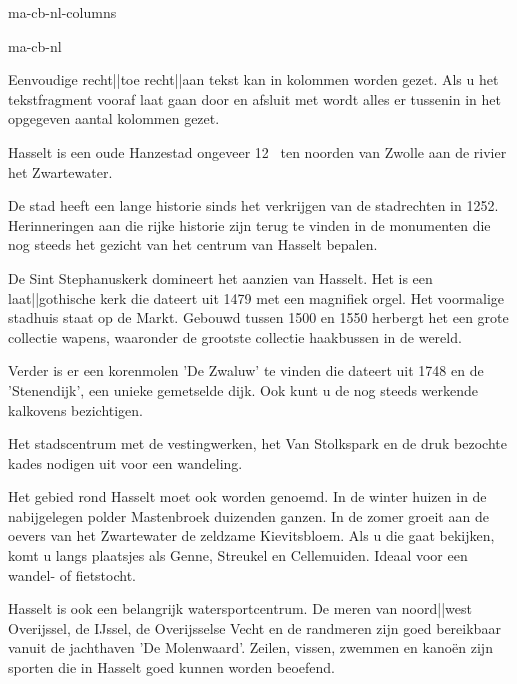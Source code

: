 \startonderdeel ma-cb-nl-columns

\produkt ma-cb-nl




Eenvoudige recht||toe recht||aan tekst kan in kolommen worden
gezet. Als u het tekstfragment vooraf laat gaan door
\type{\startkolommen} en afsluit met \type{\stopkolommen}
wordt alles er tussenin in het opgegeven aantal kolommen
gezet.


\startbuffer
\startkolommen[n=3,tolerantie=zeersoepel]
Hasselt is een oude Hanzestad ongeveer 12 \Kilo \Meter\ ten
noorden van Zwolle aan de rivier het Zwartewater.

De stad heeft een lange historie sinds het verkrijgen van de
stadrechten in 1252. Herinneringen aan die rijke historie
zijn terug te vinden in de monumenten die nog steeds het
gezicht van het centrum van Hasselt bepalen.

De Sint Stephanuskerk domineert het aanzien van Hasselt. Het
is een laat||gothische kerk die dateert uit 1479 met een
magnifiek orgel. Het voormalige stadhuis staat op de Markt.
Gebouwd tussen 1500 en 1550 herbergt het een grote collectie
wapens, waaronder de grootste collectie haakbussen in de
wereld.

Verder is er een korenmolen 'De Zwaluw' te vinden die
dateert uit 1748 en de 'Stenendijk', een unieke gemetselde
dijk. Ook kunt u de nog steeds werkende kalkovens
bezichtigen.

Het stadscentrum met de vestingwerken, het Van Stolkspark en
de druk bezochte kades nodigen uit voor een wandeling.

Het gebied rond Hasselt moet ook worden genoemd. In de
winter huizen in de nabijgelegen polder Mastenbroek
duizenden ganzen. In de zomer groeit aan de oevers van het
Zwartewater de zeldzame Kievitsbloem. Als u die gaat
bekijken, komt u langs plaatsjes als Genne, Streukel en
Cellemuiden. Ideaal voor een wandel- of fietstocht.

Hasselt is ook een belangrijk watersportcentrum. De meren
van noord||west Overijssel, de IJssel, de Overijsselse Vecht
en de randmeren zijn goed bereikbaar vanuit de jachthaven
'De Molenwaard'. Zeilen, vissen, zwemmen en kano\"en zijn
sporten die in Hasselt goed kunnen worden beoefend.

